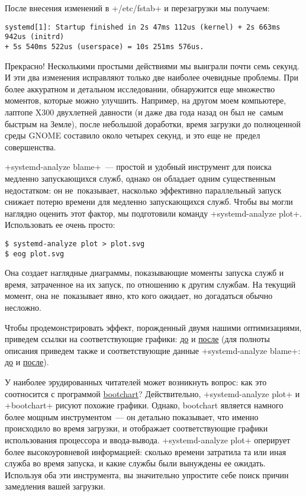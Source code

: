 \documentclass[10pt,oneside,a4paper]{article}
\begin{document}
После внесения изменений в +/etc/fstab+ и перезагрузки мы получаем:
\begin{Verbatim}
systemd[1]: Startup finished in 2s 47ms 112us (kernel) + 2s 663ms 942us (initrd)
+ 5s 540ms 522us (userspace) = 10s 251ms 576us.
\end{Verbatim}

Прекрасно! Несколькими простыми действиями мы выиграли почти семь секунд. И эти
два изменения исправляют только две наиболее очевидные проблемы. При более
аккуратном и детальном исследовании, обнаружится еще множество моментов, которые
можно улучшить. Например, на другом моем компьютере, лаптопе X300 двухлетней
давности (и даже два года назад он был не~самым быстрым на Земле), после
небольшой доработки, время загрузки до полноценной среды GNOME
составило около четырех секунд, и это еще не~предел совершенства.

+systemd-analyze blame+~--- простой и удобный инструмент для поиска медленно
запускающихся служб, однако он обладает одним существенным недостатком: он
не~показывает, насколько эффективно параллельный запуск снижает потерю времени
для медленно запускающихся служб. Чтобы вы могли наглядно оценить этот фактор,
мы подготовили команду +systemd-analyze plot+. Использовать ее очень просто:
\begin{Verbatim}
$ systemd-analyze plot > plot.svg
$ eog plot.svg
\end{Verbatim}

Она создает наглядные диаграммы, показывающие моменты запуска служб и время,
затраченное на их запуск, по отношению к другим службам. На текущий момент, она
не~показывает явно, кто кого ожидает, но догадаться обычно несложно.

Чтобы продемонстрировать эффект, порожденный двумя нашими оптимизациями,
приведем ссылки на соответствующие графики:
\href{http://0pointer.de/public/blame.svg}{до} и
\href{http://0pointer.de/public/blame2.svg}{после} (для полноты описания приведем также и
соответствующие данные +systemd-analyze blame+:
\href{http://0pointer.de/public/blame.txt}{до} и
\href{http://0pointer.de/public/blame2.txt}{после}).

У наиболее эрудированных читателей может возникнуть вопрос: как это соотносится с
программой \href{https://github.com/mmeeks/bootchart}{bootchart}? Действительно,
+systemd-analyze plot+ и +bootchart+ рисуют похожие графики. Однако, bootchart
является намного более мощным инструментом~--- он детально показывает, что
именно происходило во время загрузки, и отображает соответствующие графики
использования процессора и ввода-вывода. +systemd-analyze plot+ оперирует более
высокоуровневой информацией: сколько времени затратила та или иная служба во
время запуска, и какие службы были вынуждены ее ожидать. Используя оба эти
инструмента, вы значительно упростите себе поиск причин замедления вашей
загрузки.
\end{document}
